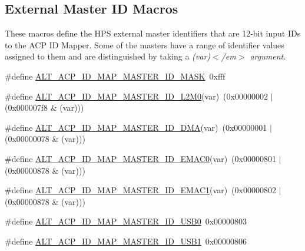 \subsection*{External Master ID Macros}
\label{_amgrp02719c269b839c66d39272fc87b9b919}%
These macros define the H\+PS external master identifiers that are 12-\/bit input I\+Ds to the A\+CP ID Mapper. Some of the masters have a range of identifier values assigned to them and are distinguished by taking a {\itshape (var)$<$/em$>$ argument. }\begin{DoxyCompactItemize}
\item 
\#define \mbox{\hyperlink{group__ADDR__SPACE__MGR__MEM__COHERENCE_gaa4f88a93f51a5b6a44c9d6a8e1498bef}{A\+L\+T\+\_\+\+A\+C\+P\+\_\+\+I\+D\+\_\+\+M\+A\+P\+\_\+\+M\+A\+S\+T\+E\+R\+\_\+\+I\+D\+\_\+\+M\+A\+SK}}~0xfff
\item 
\#define \mbox{\hyperlink{group__ADDR__SPACE__MGR__MEM__COHERENCE_ga468652a3f2df1e337e6b7cc7b2155a2b}{A\+L\+T\+\_\+\+A\+C\+P\+\_\+\+I\+D\+\_\+\+M\+A\+P\+\_\+\+M\+A\+S\+T\+E\+R\+\_\+\+I\+D\+\_\+\+L2\+M0}}(var)~(0x00000002 $\vert$ (0x000007f8 \& (var)))
\item 
\#define \mbox{\hyperlink{group__ADDR__SPACE__MGR__MEM__COHERENCE_gaad12f9ccaa26d45e91e3860fce824a93}{A\+L\+T\+\_\+\+A\+C\+P\+\_\+\+I\+D\+\_\+\+M\+A\+P\+\_\+\+M\+A\+S\+T\+E\+R\+\_\+\+I\+D\+\_\+\+D\+MA}}(var)~(0x00000001 $\vert$ (0x00000078 \& (var)))
\item 
\#define \mbox{\hyperlink{group__ADDR__SPACE__MGR__MEM__COHERENCE_ga8d44a9929f75bf66bcf719d12a21d8ee}{A\+L\+T\+\_\+\+A\+C\+P\+\_\+\+I\+D\+\_\+\+M\+A\+P\+\_\+\+M\+A\+S\+T\+E\+R\+\_\+\+I\+D\+\_\+\+E\+M\+A\+C0}}(var)~(0x00000801 $\vert$ (0x00000878 \& (var)))
\item 
\#define \mbox{\hyperlink{group__ADDR__SPACE__MGR__MEM__COHERENCE_gaa776ac99cf105e022e70d8337b928818}{A\+L\+T\+\_\+\+A\+C\+P\+\_\+\+I\+D\+\_\+\+M\+A\+P\+\_\+\+M\+A\+S\+T\+E\+R\+\_\+\+I\+D\+\_\+\+E\+M\+A\+C1}}(var)~(0x00000802 $\vert$ (0x00000878 \& (var)))
\item 
\#define \mbox{\hyperlink{group__ADDR__SPACE__MGR__MEM__COHERENCE_gae962b24a0cd3c2f823388b1a44a26e50}{A\+L\+T\+\_\+\+A\+C\+P\+\_\+\+I\+D\+\_\+\+M\+A\+P\+\_\+\+M\+A\+S\+T\+E\+R\+\_\+\+I\+D\+\_\+\+U\+S\+B0}}~0x00000803
\item 
\#define \mbox{\hyperlink{group__ADDR__SPACE__MGR__MEM__COHERENCE_gae6baeffd67337c895bb67df2583cc14e}{A\+L\+T\+\_\+\+A\+C\+P\+\_\+\+I\+D\+\_\+\+M\+A\+P\+\_\+\+M\+A\+S\+T\+E\+R\+\_\+\+I\+D\+\_\+\+U\+S\+B1}}~0x00000806
\item 

\end{DoxyCompactItemize}
